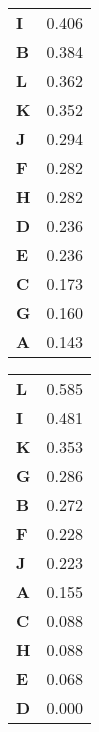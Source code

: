 \begin{table}[!h]
\centering
\centering
\begin{tabular}[t]{>{}lr}
\toprule
\textbf{I} & 0.406\\
\textbf{B} & 0.384\\
\textbf{L} & 0.362\\
\textbf{K} & 0.352\\
\textbf{J} & 0.294\\
\textbf{F} & 0.282\\
\textbf{H} & 0.282\\
\textbf{D} & 0.236\\
\textbf{E} & 0.236\\
\textbf{C} & 0.173\\
\textbf{G} & 0.160\\
\textbf{A} & 0.143\\
\bottomrule
\end{tabular}
\centering
\begin{tabular}[t]{lr}
\toprule
\textbf{L} & 0.585\\
\textbf{I} & 0.481\\
\textbf{K} & 0.353\\
\textbf{G} & 0.286\\
\textbf{B} & 0.272\\
\textbf{F} & 0.228\\
\textbf{J} & 0.223\\
\textbf{A} & 0.155\\
\textbf{C} & 0.088\\
\textbf{H} & 0.088\\
\textbf{E} & 0.068\\
\textbf{D} & 0.000\\
\bottomrule
\end{tabular}
\end{table}
